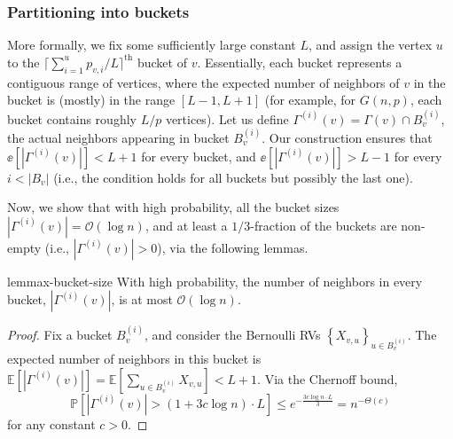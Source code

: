 \subsubsection{Partitioning into buckets}
\label{sec:bucket_partition}
More formally, we fix some sufficiently large constant $L$,
and assign the vertex $u$ to the $\lceil\sum^{u}_{i=1} p_{v,i}/L\rceil^\textrm{th}$ bucket of $v$.
Essentially, each bucket represents a contiguous range of vertices,
where the expected number of neighbors of $v$ in the bucket is (mostly) in the range $[L-1,L+1]$
(for example, for $G(n,p)$, each bucket contains roughly $L/p$ vertices).
Let us define $\Gamma^{(i)}(v) = \Gamma(v) \cap B_v^{(i)}$,
the actual neighbors appearing in bucket $B^{(i)}_v$.
Our construction ensures that $\ee \left[|\Gamma^{(i)}(v)|\right] < L+1$ for every bucket,
and $\ee\left[|\Gamma^{(i)}(v)|\right] > L-1$ for every $i < |B_v|$
(i.e., the condition holds for all buckets but possibly the last one).

Now, we show that with high probability, all the bucket sizes $|\Gamma^{(i)}(v)|=\mathcal{O}(\log n)$, and at least a $1/3$-fraction of the buckets are non-empty (i.e., $|\Gamma^{(i)}(v)|>0$), via the following lemmas.

\begin{restatable}{lem}{max-bucket-size}
\label{lem:max_bucket_size}
With high probability, the number of neighbors in every bucket, $|\Gamma^{(i)}(v)|$, is at most $ \mathcal{O}(\log n)$.
\end{restatable}
\begin{proof}
Fix a bucket $B_v^{(i)}$, and consider the Bernoulli RVs $\left\{ X_{v,u}\right\}_{u\in B_v^{(i)}}$.
The expected number of neighbors in this bucket is
$ \textstyle\mathbb{E} \left[ |\Gamma^{(i)}(v)| \right] =\mathbb{E} \left[ \sum_{u\in B_v^{(i)}} X_{v,u} \right] < L+1$.
Via the Chernoff bound,
$$
\mathbb{P} \left[ |\Gamma^{(i)}(v)|> (1+3c\log n)\cdot L \right]
\le e^{-\frac{3c\log n\cdot L}{3}} = n^{-\Theta(c)}
$$
for any constant $c > 0$.
\end{proof}

